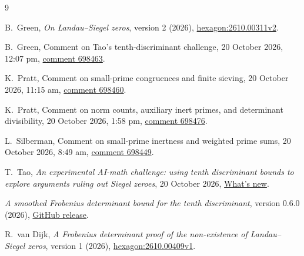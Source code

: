 \documentclass[11pt]{article}
\newcommand{\blog}{https://terrytao.wordpress.com/2026/10/20/an-experimental-ai-math-challenge-using-tenth-discriminant-bounds-to-explore-arguments-ruling-out-siegel-zeroes/}
\begin{document}
\clearpage
\begin{thebibliography}{9}

B.~Green, \emph{On Landau--Siegel zeros}, version 2 (2026),
\href{https://hexagonmath.org/2610.00311v2}{hexagon:2610.00311v2}.

B.~Green, Comment on Tao's tenth-discriminant challenge,
20 October 2026, 12:07 pm,
\href{\blog\#comment-698463}{comment 698463}.

K.~Pratt, Comment on small-prime congruences and finite sieving,
20 October 2026, 11:15 am,
\href{\blog\#comment-698460}{comment 698460}.

K.~Pratt, Comment on norm counts, auxiliary inert primes, and
determinant divisibility, 20 October 2026, 1:58 pm,
\href{\blog\#comment-698476}{comment 698476}.

L.~Silberman, Comment on small-prime inertness and weighted prime
sums, 20 October 2026, 8:49 am,
\href{\blog\#comment-698449}{comment 698449}.

T.~Tao, \emph{An experimental AI-math challenge: using tenth
discriminant bounds to explore arguments ruling out Siegel zeroes},
20 October 2026, \href{\blog}{What's new}.

\emph{A smoothed Frobenius determinant bound for the
tenth discriminant}, version 0.6.0 (2026),
\href{https://github.com/twinheterodox/tenth-discriminant/releases/tag/v0.6.0}{GitHub release}.

R.~van Dijk, \emph{A Frobenius determinant proof of the non-existence
of Landau--Siegel zeros}, version 1 (2026),
\href{https://hexagonmath.org/2610.00409v1}{hexagon:2610.00409v1}.

\end{thebibliography}
\end{document}
